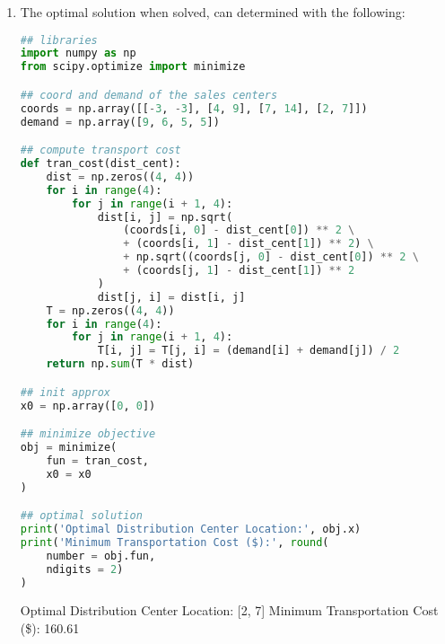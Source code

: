 \documentclass{article}
\begin{document}
\begin{enumerate}
\begin{enumerate}
        \item The optimal solution when solved, can determined with the following:
        
\begin{lstlisting}[language=Python, title=Fig. Python 3(c)]
## libraries
import numpy as np
from scipy.optimize import minimize

## coord and demand of the sales centers
coords = np.array([[-3, -3], [4, 9], [7, 14], [2, 7]])
demand = np.array([9, 6, 5, 5])

## compute transport cost
def tran_cost(dist_cent):
    dist = np.zeros((4, 4))
    for i in range(4):
        for j in range(i + 1, 4):
            dist[i, j] = np.sqrt(
                (coords[i, 0] - dist_cent[0]) ** 2 \
                + (coords[i, 1] - dist_cent[1]) ** 2) \
                + np.sqrt((coords[j, 0] - dist_cent[0]) ** 2 \
                + (coords[j, 1] - dist_cent[1]) ** 2
            )
            dist[j, i] = dist[i, j]
    T = np.zeros((4, 4))
    for i in range(4):
        for j in range(i + 1, 4):
            T[i, j] = T[j, i] = (demand[i] + demand[j]) / 2
    return np.sum(T * dist)

## init approx
x0 = np.array([0, 0])

## minimize objective
obj = minimize(
    fun = tran_cost, 
    x0 = x0
)

## optimal solution
print('Optimal Distribution Center Location:', obj.x)
print('Minimum Transportation Cost ($):', round(
    number = obj.fun, 
    ndigits = 2)
)
\end{lstlisting}

        Optimal Distribution Center Location: [2, 7] \quad
        Minimum Transportation Cost (\$): 160.61    
    \end{enumerate}
        
\end{enumerate}
\end{document}
